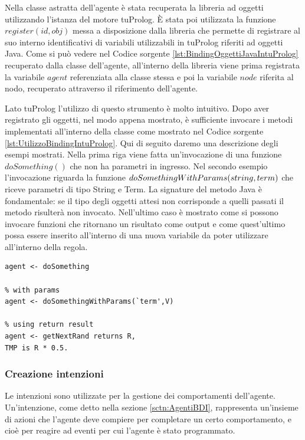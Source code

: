 Nella classe astratta dell'agente è stata recuperata la libreria ad oggetti utilizzando l'istanza del motore tuProlog.
È stata poi utilizzata la funzione $register(id, obj)$ messa a disposizione dalla libreria che permette di registrare al suo interno identificativi di variabili utilizzabili in tuProlog riferiti ad oggetti Java.
Come si può vedere nel Codice sorgente \ref{lst:BindingOggettiJavaIntuProlog} recuperato dalla classe dell'agente, all'interno della libreria viene prima registrata la variabile $agent$ referenziata alla classe stessa e poi la variabile $node$ riferita al nodo, recuperato attraverso il riferimento dell'agente.

Lato tuProlog l'utilizzo di questo strumento è molto intuitivo. Dopo aver registrato gli oggetti, nel modo appena mostrato, è sufficiente invocare i metodi implementati all'interno della classe come mostrato nel Codice sorgente \ref{lst:UtilizzoBindingIntuProlog}. Qui di seguito daremo una descrizione degli esempi mostrati.
Nella prima riga viene fatta un'invocazione di una funzione $doSomething()$ che non ha parametri in ingresso.
Nel secondo esempio l'invocazione riguarda la funzione $doSome\-thingWithParams(string, term)$ che riceve parametri di tipo String e Term. La signature del metodo Java è fondamentale: se il tipo degli oggetti attesi non corrisponde a quelli passati il metodo risulterà non invocato.
Nell'ultimo caso è mostrato come si possono invocare funzioni che ritornano un risultato come output e come quest'ultimo possa essere inserito all'interno di una nuova variabile da poter utilizzare all'interno della regola.

\switchToProlog{}
\begin{lstlisting}[float,firstnumber=1,label={lst:UtilizzoBindingIntuProlog},caption={Utilizzo riferimenti oggetti Java in tuProlog}]
% no params
agent <- doSomething

% with params
agent <- doSomethingWithParams(`term',V)

% using return result
agent <- getNextRand returns R,
TMP is R * 0.5.
\end{lstlisting}

\subsubsection{Creazione intenzioni}
Le intenzioni sono utilizzate per la gestione dei comportamenti dell'agente. Un'intenzione, come detto nella sezione \ref{sctn:AgentiBDI}, rappresenta un'insieme di azioni che l'agente deve compiere per completare un certo comportamento, e cioè per reagire ad eventi per cui l'agente è stato programmato.

